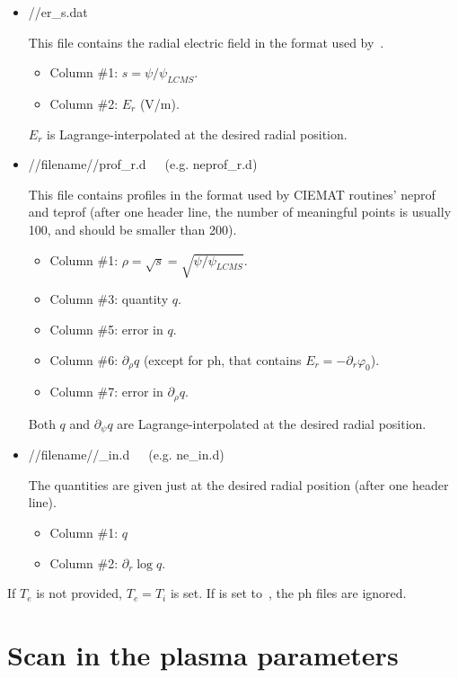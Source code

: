 \begin{itemize}
\item {\ttfamily //er\_s.dat}

This file contains the radial electric field in the format used by~\EUTERPE.
\begin{itemize}
\item Column \#1: $s=\psi/\psi_{LCMS}$.
\item Column \#2: $E_r$ (V/m).
\end{itemize}
$E_r$ is Lagrange-interpolated at the desired radial position. 


\item {\ttfamily //filename//prof\_r.d}~~~(e.g. {\ttfamily neprof\_r.d})

This file contains profiles in the format used by CIEMAT routines' {\ttfamily neprof}~\citep{milligen2011bayes} and {\ttfamily teprof} (after one header line, the number of meaningful points is usually 100, and should be smaller than 200). 
\begin{itemize}
\item Column \#1: $\rho=\sqrt{s}=\sqrt{\psi/\psi_{LCMS}}$.
\item Column \#3: quantity $q$.
\item Column \#5: error in $q$.
\item Column \#6: $\partial_\rho q$ (except for {\ttfamily ph}, that contains $E_r=-\partial_r\varphi_0$).
\item Column \#7: error in $\partial_\rho q$.
\end{itemize}
Both $q$ and $\partial_\psi q$ are Lagrange-interpolated at the desired radial position.

\item {\ttfamily //filename//\_in.d}~~~(e.g. {\ttfamily ne\_in.d})

The quantities are given just at the desired radial position (after one header line).
\begin{itemize}
\item Column \#1: $q$
\item Column \#2: $\partial_r \log{q}$.
\end{itemize}

\end{itemize}

If $T_e$ is not provided, $T_e=T_i$ is set. If  is set to~\true, the {\ttfamily ph} files are ignored.




\section{Scan in the plasma parameters}\label{SEC_SCAN_PLASMA}

